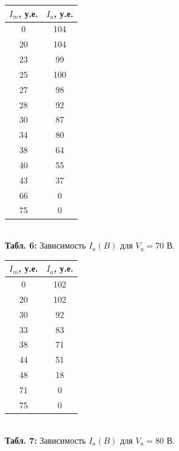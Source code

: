 \documentclass[12pt,a4paper]{scrartcl}
\begin{document}
	\begin{figure}[h]
	\begin{minipage}{0.5\linewidth}
	\begin{center}
\begin{tabular}{|c|c|}
\hline
$I_m$, у.е. & $I_a$, у.е. \\ \hline
0 & 104  \\ \hline
20 & 104  \\ \hline
23 & 99  \\ \hline
25 & 100  \\ \hline
27 & 98  \\ \hline
28 & 92  \\ \hline
30 & 87  \\ \hline
34 & 80  \\ \hline
38 & 64  \\ \hline
40 & 55  \\ \hline
43 & 37  \\ \hline
66 & 0  \\ \hline
75 & 0  \\ \hline
\end{tabular}\\
\textbf{Табл. 6:} Зависимость $I_a(B)$ для $V_a = 70 $ В.
\end{center}
	\end{minipage}
	\begin{minipage}{0.5\linewidth}
	\begin{center}
\begin{tabular}{|c|c|}
\hline
$I_m$, у.е. & $I_a$, у.е. \\ \hline
0 & 102  \\ \hline
20 & 102  \\ \hline
30 & 92  \\ \hline
33 & 83  \\ \hline
38 & 71  \\ \hline
44 & 51  \\ \hline
48 & 18  \\ \hline
71 & 0  \\ \hline
75 & 0  \\ \hline
\end{tabular}\\
\textbf{Табл. 7:} Зависимость $I_a(B)$ для $V_a = 80$ В.
\end{center}
	\end{minipage}
	\end{figure}
	
\end{document}
